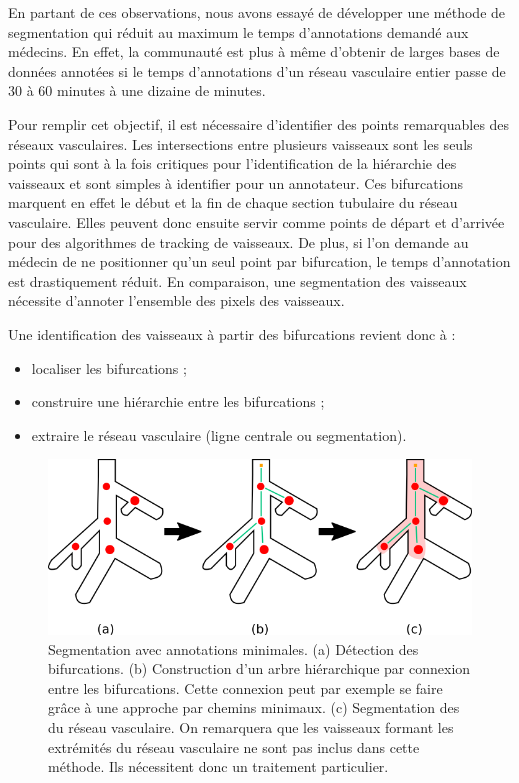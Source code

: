 En partant de ces observations, nous avons essayé de développer une méthode de segmentation qui réduit au maximum le temps d'annotations demandé aux médecins. En effet, la communauté est plus à même d'obtenir de larges bases de données annotées si le temps d'annotations d'un réseau vasculaire entier passe de 30 à 60 minutes à une dizaine de minutes. 

Pour remplir cet objectif, il est nécessaire d'identifier des points remarquables des réseaux vasculaires. Les intersections entre plusieurs vaisseaux sont les seuls points qui sont à la fois critiques pour l'identification de la hiérarchie des vaisseaux et sont simples à identifier pour un annotateur. Ces bifurcations marquent en effet le début et la fin de chaque section tubulaire du réseau vasculaire. Elles peuvent donc ensuite servir comme points de départ et d'arrivée pour des algorithmes de tracking de vaisseaux.  De plus, si l'on demande au médecin de ne positionner qu'un seul point par bifurcation, le temps d'annotation est drastiquement réduit. En comparaison, une segmentation des vaisseaux nécessite d'annoter l'ensemble des pixels des vaisseaux.
 
Une identification des vaisseaux à partir des bifurcations revient donc à :

\begin{itemize}
\item localiser les bifurcations ;
\item construire une hiérarchie entre les bifurcations ;
\item extraire le réseau vasculaire (ligne centrale ou segmentation).
\end{itemize}

\begin{figure}[!ht]
    \centering
    \includegraphics[width=\textwidth]{Images/thrifty_annotations.png}
    \caption{Segmentation avec annotations minimales. (a) Détection des bifurcations. (b) Construction d'un arbre hiérarchique par connexion entre les bifurcations. Cette connexion peut par exemple se faire grâce à une approche par chemins minimaux. (c) Segmentation des du réseau vasculaire. On remarquera que les vaisseaux formant les extrémités du réseau vasculaire ne sont pas inclus dans cette méthode. Ils nécessitent donc un traitement particulier.}
    \label{fig:thrifty}
  \end{figure}


